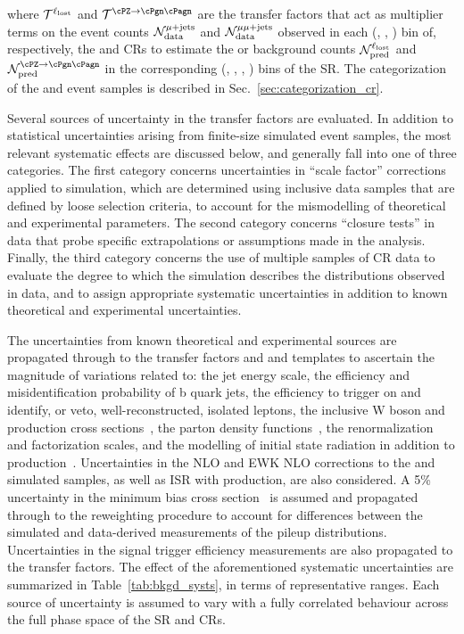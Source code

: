 where $\mathcal{T}^{\ell_\textrm{lost}}$ and $\tf^{\znunu}$ are the transfer factors that
act as multiplier terms on the event counts
$\mathcal{N}^{\mu + \text{jets}}_\textrm{data}$ and
$\mathcal{N}^{\mu\mu + \text{jets}}_\textrm{data}$ observed in each (\njet, \scalht,
\nb) bin of, respectively, the \mj and \mmj CRs to estimate the \lost
or \znunuj background counts $\mathcal{N}^{\ell_\textrm{lost}}_\textrm{pred}$ and
$\mathcal{N}^{\znunu}_\textrm{pred}$ in the corresponding (\njet,
\scalht, \nb, \mht) bins of the SR. The categorization of the \mj and
\mmj event samples is described in Sec.~\ref{sec:categorization_cr}.

Several sources of uncertainty in the transfer factors are evaluated.
In addition to statistical uncertainties arising from finite-size
simulated event samples, the most relevant systematic effects are
discussed below, and generally fall into one of three categories. The
first category concerns uncertainties in ``scale factor'' corrections
applied to simulation, which are determined using inclusive data
samples that are defined by loose selection criteria, to account for
the mismodelling of theoretical and experimental parameters. The
second category concerns ``closure tests'' in data that probe specific
extrapolations or assumptions made in the analysis. Finally, the third
category concerns the use of multiple samples of CR data to evaluate
the degree to which the simulation describes the \mht distributions
observed in data, and to assign appropriate systematic uncertainties
in addition to known theoretical and experimental uncertainties.

The uncertainties from known theoretical and experimental sources are
propagated through to the transfer factors and \mht and \nb templates
to ascertain the magnitude of variations related to: the jet energy
scale, the efficiency and misidentification probability of b quark
jets, the efficiency to trigger on and identify, or veto,
well-reconstructed, isolated leptons, the inclusive W boson and \ttbar
production cross sections~\cite{}, the parton density
functions~\cite{}, the renormalization and factorization scales, and
the modelling of initial state radiation in addition to \ttbar
production~\cite{}. Uncertainties in the NLO and EWK NLO corrections
to the \wj and \zj simulated samples, as well as ISR with \ttbar
production, are also considered. A 5\% uncertainty in the minimum bias
cross section~\cite{} is assumed and propagated through to the
reweighting procedure to account for differences between the simulated
and data-derived measurements of the pileup
distributions. Uncertainties in the signal trigger efficiency
measurements are also propagated to the transfer factors. The effect
of the aforementioned systematic uncertainties are summarized in
Table~\ref{tab:bkgd_systs}, in terms of representative ranges.  Each
source of uncertainty is assumed to vary with a fully correlated
behaviour across the full phase space of the SR and CRs.

